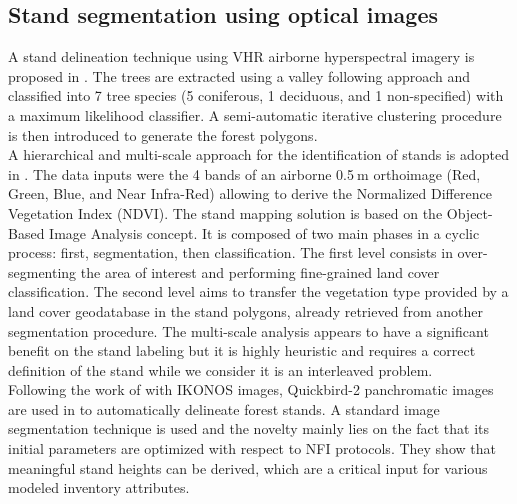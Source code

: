 \subsection{Stand segmentation using optical images}
A stand delineation technique using VHR airborne hyperspectral imagery is proposed in \citep{leckie2003stand}. The trees are extracted using a valley following approach and classified into 7 tree species (5 coniferous, 1 deciduous, and 1 non-specified) with a maximum likelihood classifier. A semi-automatic iterative clustering procedure is then introduced to generate the forest polygons.\\
A hierarchical and multi-scale approach for the identification of stands is adopted in \citep{hernando2012spatial}. The data inputs were the 4 bands of an airborne 0.5$\:$m orthoimage (Red, Green, Blue, and Near Infra-Red) allowing to derive the Normalized Difference Vegetation Index (NDVI). The stand mapping solution is based on the Object-Based Image Analysis concept. It is composed of two main phases in a cyclic process: first, segmentation, then classification. The first level consists in over-segmenting the area of interest and performing fine-grained land cover classification. The second level aims to transfer the vegetation type provided by a land cover geodatabase in the stand polygons, already retrieved from another segmentation procedure. The multi-scale analysis appears to have a significant benefit on the stand labeling but it is highly heuristic and requires a correct definition of the stand while we consider it is an interleaved problem. \\
Following the work of \citep{Wulder2008} with IKONOS images, Quickbird-2 panchromatic images are used in \citep{Mora20102474} to automatically delineate forest stands. A standard image segmentation technique is used and the novelty mainly lies on the fact that its initial parameters are optimized with respect to NFI protocols. They show that meaningful stand heights can be derived, which are a critical input for various modeled inventory attributes.\\

